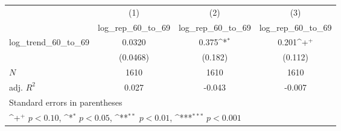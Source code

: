 {
\def\sym#1{\ifmmode^{#1}\else\(^{#1}\)\fi}
\begin{tabular}{l*{3}{c}}
\hline\hline
            &\multicolumn{1}{c}{(1)}&\multicolumn{1}{c}{(2)}&\multicolumn{1}{c}{(3)}\\
            &\multicolumn{1}{c}{log\_rep\_60\_to\_69}&\multicolumn{1}{c}{log\_rep\_60\_to\_69}&\multicolumn{1}{c}{log\_rep\_60\_to\_69}\\
\hline
log\_trend\_60\_to\_69&      0.0320         &       0.375\sym{*}  &       0.201\sym{+}  \\
            &    (0.0468)         &     (0.182)         &     (0.112)         \\
\hline
\(N\)       &        1610         &        1610         &        1610         \\
adj. \(R^{2}\)&       0.027         &      -0.043         &      -0.007         \\
\hline\hline
\multicolumn{4}{l}{\footnotesize Standard errors in parentheses}\\
\multicolumn{4}{l}{\footnotesize \sym{+} \(p<0.10\), \sym{*} \(p<0.05\), \sym{**} \(p<0.01\), \sym{***} \(p<0.001\)}\\
\end{tabular}
}
